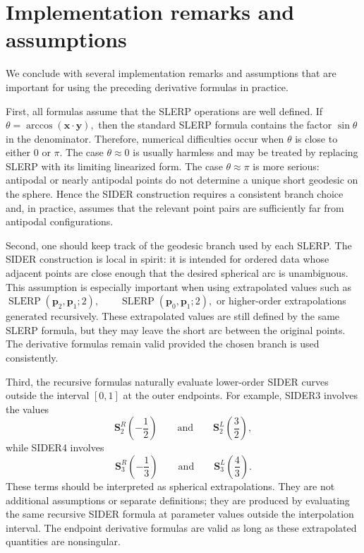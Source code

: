 \documentclass[a4paper,11pt]{article}
\newcommand{\bx}{\mathbf{x}}
\newcommand{\by}{\mathbf{y}}
\newcommand{\bp}{\mathbf{p}}
\numberwithin{equation}{section}
\theoremstyle{plain}
\theoremstyle{definition}
\theoremstyle{remark}
\newcommand{\slerp}{\operatorname{SLERP}}
\begin{document}
\section{Implementation remarks and assumptions}\label{sec:implementation}

We conclude with several implementation remarks and assumptions that are important for using the preceding derivative formulas in practice.

First, all formulas assume that the SLERP operations are well defined.  If
\(\theta=\arccos(\bx\cdot \by),\)
then the standard SLERP formula contains the factor $\sin\theta$ in the denominator.  Therefore, numerical difficulties occur when $\theta$ is close to either $0$ or $\pi$.  The case $\theta\approx 0$ is usually harmless and may be treated by replacing SLERP with its limiting linearized form.  The case $\theta\approx \pi$ is more serious: antipodal or nearly antipodal points do not determine a unique short geodesic on the sphere.  Hence the SIDER construction requires a consistent branch choice and, in practice, assumes that the relevant point pairs are sufficiently far from antipodal configurations.

Second, one should keep track of the geodesic branch used by each SLERP.  The SIDER construction is local in spirit: it is intended for ordered data whose adjacent points are close enough that the desired spherical arc is unambiguous.  This assumption is especially important when using extrapolated values such as
\(\slerp(\bp_2,\bp_1;2), \qquad \slerp(\bp_0,\bp_1;2),\)
or higher-order extrapolations generated recursively.  These extrapolated values are still defined by the same SLERP formula, but they may leave the short arc between the original points.  The derivative formulas remain valid provided the chosen branch is used consistently.

Third, the recursive formulas naturally evaluate lower-order SIDER curves outside the interval $[0,1]$ at the outer endpoints.  For example, SIDER3 involves the values
\[
        \mathbf{S}_2^R\!\left(-\frac12\right)
        \qquad\text{and}\qquad
        \mathbf{S}_2^L\!\left(\frac32\right),
\]
while SIDER4 involves
\[
        \mathbf{S}_3^R\!\left(-\frac13\right)
        \qquad\text{and}\qquad
        \mathbf{S}_3^L\!\left(\frac43\right).
\]
These terms should be interpreted as spherical extrapolations.  They are not additional assumptions or separate definitions; they are produced by evaluating the same recursive SIDER formula at parameter values outside the interpolation interval.  The endpoint derivative formulas are valid as long as these extrapolated quantities are nonsingular.
\end{document}
